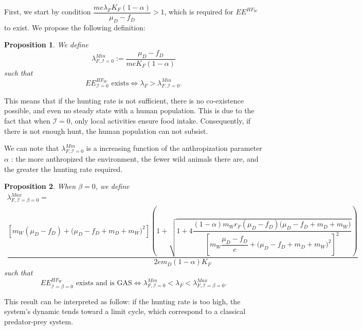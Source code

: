\documentclass{article}
\newcommand{\lfw}{\lambda_{F}}
\newcommand{\lfw}{\lambda_{F}}
\newcommand{\cI}{\mathcal{I}}
\newtheorem{prop}{Proposition}
\begin{document}
First, we start by condition $\dfrac{m e \lfw  K_F(1-\alpha)}{\mu_D - f_D} > 1$, which is required for $EE^{HF_W}$ to exist. We propose the following definition:

\begin{prop}\label{defLambdaMin, cI=0} We define 
$$\lambda_{F, \cI=0}^{Min} := \dfrac{\mu_D - f_D}{m e K_F(1-\alpha)}$$
such that 
$$
\text{$EE^{HF_W}_{\cI = 0}$ exists} \Leftrightarrow  \lfw > \lambda_{F, \cI=0}^{Min}.
$$
\end{prop}

This means that if the hunting rate is not sufficient, there is no co-existence possible, and even no steady state with a human population. This is due to the fact that when $\cI = 0$, only local activities ensure food intake. Consequently, if there is not enough hunt, the human population can not subsist.

We can note that $\lambda_{F, \cI=0}^{Min}$ is a increasing function of the anthropization parameter $\alpha$ : the more anthropized the environment, the fewer wild animals there are, and the greater the hunting rate required. 

\begin{prop}
When $\beta = 0 $, we define
\begin{multline*}
\lambda_{F, \cI = \beta =0}^{Max}  = \\
\dfrac{\left[m_{W}(\mu_{D}-f_{D})+\big(\mu_{D}-f_{D}+m_{D}+m_{W})^{2}\right]\left(1+\sqrt{1+4\dfrac{(1-\alpha)m_{W}r_{F}\left(\mu_{D}-f_{D}\right)\big(\mu_{D}-f_{D}+m_{D}+m_{W})}{\left[m_{W}\dfrac{\mu_{D}-f_{D}}{e}+\big(\mu_{D}-f_{D}+m_{D}+m_{W})^{2}\right]^{2}}}\right)}{2em_D (1-\alpha) K_F }
\end{multline*}
such that $$
\text{$EE^{HF_W}_{\cI = \beta = 0}$ exists and is GAS} \Leftrightarrow \lambda_{F, \cI=0}^{Min} < \lfw < \lambda_{F, \cI =\beta =0}^{Max}
.$$
\end{prop}

This result can be interpreted as follow: if the hunting rate is too high, the system's dynamic tends toward a limit cycle, which correspond to a classical predator-prey system.
\end{document}
